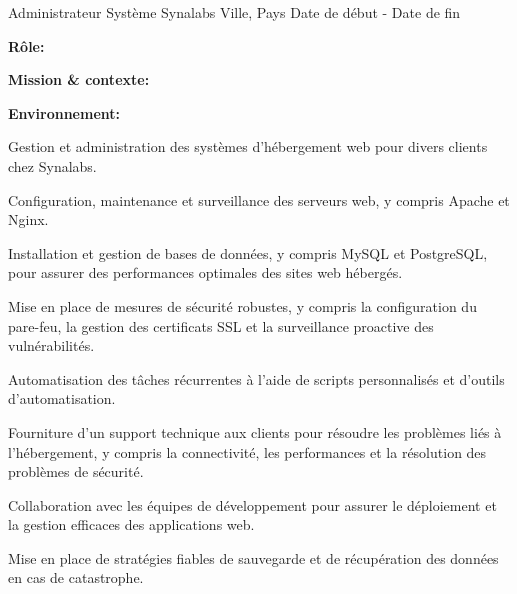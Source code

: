 \begin{cventries}
\cventry
{Administrateur Système} %
{Synalabs} %
{Ville, Pays} %
{Date de début - Date de fin} %
{
  \begin{cvitems} %
    \item {\textbf{Rôle:} }
    \item {\textbf{Mission \& contexte:} }
    \item {\textbf{Environnement:} }
    \item {Gestion et administration des systèmes d'hébergement web pour divers clients chez Synalabs.}
    \item {Configuration, maintenance et surveillance des serveurs web, y compris Apache et Nginx.}
    \item {Installation et gestion de bases de données, y compris MySQL et PostgreSQL, pour assurer des performances optimales des sites web hébergés.}
    \item {Mise en place de mesures de sécurité robustes, y compris la configuration du pare-feu, la gestion des certificats SSL et la surveillance proactive des vulnérabilités.}
    \item {Automatisation des tâches récurrentes à l'aide de scripts personnalisés et d'outils d'automatisation.}
    \item {Fourniture d'un support technique aux clients pour résoudre les problèmes liés à l'hébergement, y compris la connectivité, les performances et la résolution des problèmes de sécurité.}
    \item {Collaboration avec les équipes de développement pour assurer le déploiement et la gestion efficaces des applications web.}
    \item {Mise en place de stratégies fiables de sauvegarde et de récupération des données en cas de catastrophe.}
  \end{cvitems}
}


\end{cventries}
